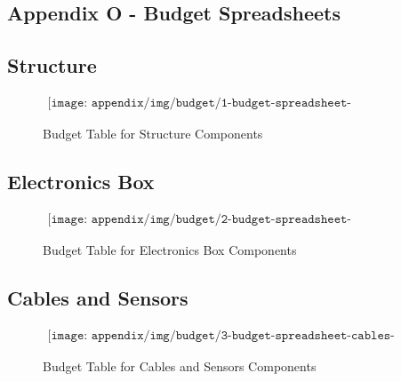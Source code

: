
\begin{landscape}
\section{Appendix O - Budget Spreadsheets}
\label{sec:appO}

\subsection{Structure}

\begin{figure}[H]
    \begin{align*}
        \texttt{[image: appendix/img/budget/1-budget-spreadsheet-structure.png]}
    \end{align*}
    \caption{Budget Table for Structure Components}
    \label{fig:budget-table-for-structure-components}
\end{figure}
\end{landscape}

\begin{landscape}
\subsection{Electronics Box}
\begin{figure}[H]
    \begin{align*}
        \texttt{[image: appendix/img/budget/2-budget-spreadsheet-electronics-box.png]}
    \end{align*}
    \caption{Budget Table for Electronics Box Components}
    \label{fig:budget-table-for-electronics-box-components}
\end{figure}
\end{landscape}

\begin{landscape}
\subsection{Cables and Sensors}
\begin{figure}[H]
    \begin{align*}
        \texttt{[image: appendix/img/budget/3-budget-spreadsheet-cables-and-sensors.png]}
    \end{align*}
    \caption{Budget Table for Cables and Sensors Components}
    \label{fig:budget-table-for-cables-and-sensors-components}
\end{figure}
\end{landscape}


